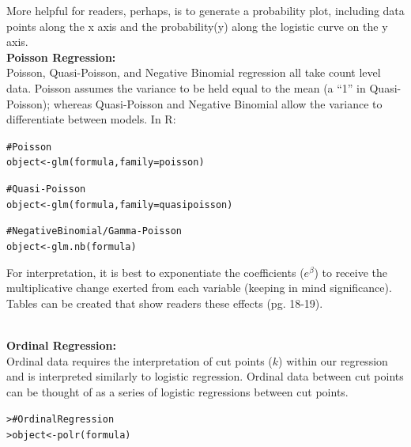 \documentclass[12pt]{article}\usepackage[]{graphicx}\usepackage[]{color}
\makeatletter
\newcommand{\hlcom}[1]{\textcolor[rgb]{0.404,0.408,0.42}{#1}}%
\newcommand{\hlstd}[1]{\textcolor[rgb]{0.882,0.878,0.898}{#1}}%
\newcommand{\hlkwb}[1]{\textcolor[rgb]{0.902,0.675,0.196}{#1}}%
\newcommand{\hlkwc}[1]{\textcolor[rgb]{0.812,0.522,0.388}{#1}}%
\newcommand{\hlkwd}[1]{\textcolor[rgb]{0.733,0.388,0.812}{#1}}%
\newenvironment{kframe}{%
 \def\at@end@of@kframe{}%
 \ifinner\ifhmode%
  \def\at@end@of@kframe{\end{minipage}}%
  \begin{minipage}{\columnwidth}%
 \fi\fi%
 \def\FrameCommand##1{\hskip\@totalleftmargin \hskip-\fboxsep
 \colorbox{shadecolor}{##1}\hskip-\fboxsep
     \hskip-\linewidth \hskip-\@totalleftmargin \hskip\columnwidth}%
 \MakeFramed {\advance\hsize-\width
   \@totalleftmargin\z@ \linewidth\hsize
   \@setminipage}}%
 {\par\unskip\endMakeFramed%
 \at@end@of@kframe}
\newenvironment{knitrout}{}{} %
\makeatother
\begin{document}
\begin{flushleft}
 More helpful for readers, perhaps, is to generate a probability plot, including data points along the x axis and the probability(y) along the logistic curve on the y axis. \\

\clearpage
\noindent \textbf{Poisson Regression:}\\
Poisson, Quasi-Poisson, and Negative Binomial regression all take count level data. Poisson assumes the variance to be held equal to the mean (a ``1'' in Quasi-Poisson); whereas Quasi-Poisson and Negative Binomial allow the variance to differentiate between models. In R:\\

\begin{knitrout}
\color{fgcolor}\begin{kframe}
\begin{alltt}
\hlcom{# Poisson}
\hlstd{object} \hlkwb{<-} \hlkwd{glm}\hlstd{(formula,} \hlkwc{family} \hlstd{= poisson)}

\hlcom{# Quasi-Poisson}
\hlstd{object} \hlkwb{<-} \hlkwd{glm}\hlstd{(formula,} \hlkwc{family} \hlstd{= quasipoisson)}

\hlcom{# Negative Binomial/ Gamma-Poisson}
\hlstd{object} \hlkwb{<-} \hlkwd{glm.nb}\hlstd{(formula)}
\end{alltt}
\end{kframe}
\end{knitrout}

For interpretation, it is best to exponentiate the coefficients ($e^\beta$) to receive the multiplicative change exerted from each variable (keeping in mind significance). Tables can be created that show readers these effects (pg. 18-19).


\hfill \\
\noindent \textbf{Ordinal Regression:}\\
Ordinal data requires the interpretation of cut points ($k$) within our regression and is interpreted similarly to logistic regression. Ordinal data between cut points can be thought of as a series of logistic regressions between cut points.


\begin{knitrout}
\color{fgcolor}\begin{kframe}
\begin{alltt}
\hlstd{> }\hlcom{# Ordinal Regression}
\hlstd{> }\hlstd{object} \hlkwb{<-} \hlkwd{polr}\hlstd{(formula)}
\end{alltt}
\end{kframe}
\end{knitrout}



\end{flushleft}
\end{document}
